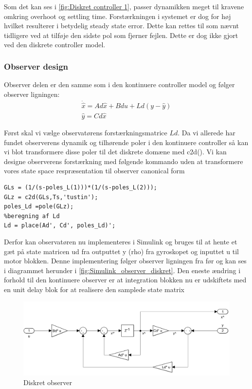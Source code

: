 Som det kan ses i \autoref{fig:Diskret controller 1}, passer dynamikken meget til kravene omkring overhoot og settling time. Forstærkningen i systemet er dog for høj hvilket resulterer i betydelig steady state error. Dette kan rettes til som nævnt tidligere ved at tilføje den sidste pol som fjerner fejlen. Dette er dog ikke gjort ved den diskrete controller model. 

\subsubsection{Observer design}
Observer delen er den samme som i den kontinuere controller model og følger observer ligningen:
\begin{gather}
\dot{\hat{x}}=Ad\hat{x}+Bdu+Ld(y-\hat{y}) \\
\hat{y}=Cd\hat{x}
\end{gather}

Først skal vi vælge observatørens forstærkningsmatrice $ Ld $. Da vi allerede har fundet observerens dynamik og tilhørende poler i den kontinuere controller så kan vi blot transformere disse poler til det diskrete domæne med c2d(). Vi kan designe observerens forstærkning med følgende kommando uden at transformere vores state space respræsentation til observer canonical form
\begin{lstlisting}[frame=single]
%valg af Ld poler 
GLs = (1/(s-poles_L(1)))*(1/(s-poles_L(2)));
GLz = c2d(GLs,Ts,'tustin');
poles_Ld =pole(GLz);
%beregning af Ld
Ld = place(Ad', Cd', poles_Ld)';  
\end{lstlisting}

Derfor kan observatøren nu implementeres i Simulink og bruges til at hente et gæt på state matricen ud fra outputtet y (rho) fra gyroskopet og inputtet u til motor blokken. Denne implementering følger observer ligningen fra før og kan ses i diagrammet herunder i \autoref{fig:Simulink_observer_diskret}.
Den eneste ændring i forhold til den kontinuere observer er at integration blokken nu er udskiftets med en unit delay blok for at realisere den samplede state matrix   

\begin{figure}[H]
	\centering
	\includegraphics[width = 1\textwidth]{figur/Simulink_observer_diskret}
	\caption{Diskret observer}
	\label{fig:Simulink_observer_diskret}
\end{figure}


